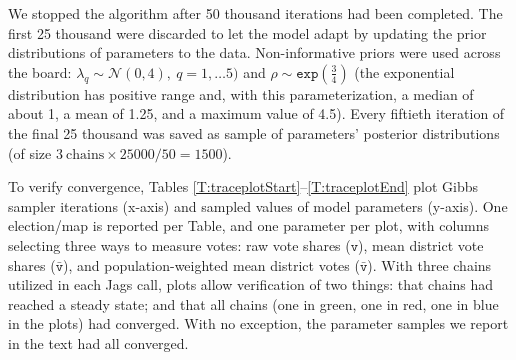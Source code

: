 \documentclass[letter,12pt]{article}
\begin{document}
\noindent We stopped the algorithm after 50 thousand iterations had been completed. The first 25 thousand were discarded to let the model adapt by updating the prior distributions of parameters to the data. Non-informative priors were used across the board: $\lambda_q \sim \mathcal{N}(0, 4),~q=1,\ldots5)$ and $\rho \sim \texttt{exp}(\frac{3}{4})$ (the exponential distribution has positive range and, with this parameterization, a median of about 1, a mean of 1.25, and a maximum value of 4.5). Every fiftieth iteration of the final 25 thousand was saved as sample of parameters' posterior distributions (of size $3~\text{chains} \times 25000/50 = 1500$). 

To verify convergence, Tables \ref{T:traceplotStart}--\ref{T:traceplotEnd} plot Gibbs sampler iterations (x-axis) and sampled values of model parameters (y-axis). One election/map is reported per Table, and one parameter per plot, with columns selecting three ways to measure votes: raw vote shares ($\texttt{v}$), mean district vote shares ($\bar{\texttt{v}}$), and population-weighted mean district votes ($\bar{\texttt{v}}$). With three chains utilized in each Jags call, plots allow verification of two things: that chains had reached a steady state; and that all chains (one in green, one in red, one in blue in the plots) had converged. With no exception, the parameter samples we report in the text had all converged.
\end{document}
